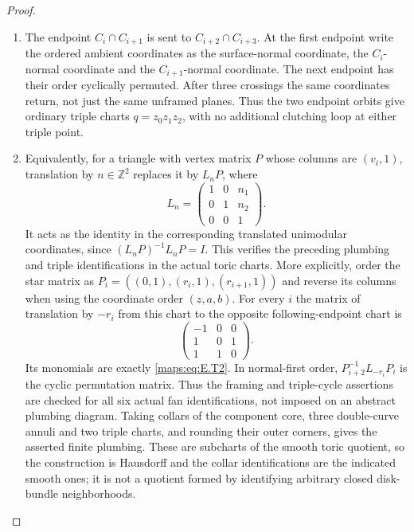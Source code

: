\begin{proof}
\begin{enumerate}[label=\arabic*.,leftmargin=*]
\item The endpoint $C_i\cap C_{i+1}$ is sent to
$C_{i+2}\cap C_{i+3}$.  At the first endpoint write the
ordered ambient coordinates as the surface-normal coordinate,
the $C_i$-normal coordinate and the $C_{i+1}$-normal coordinate.
The next endpoint has their order cyclically permuted.
After three crossings the same coordinates return, not just
the same unframed planes.  Thus the two endpoint orbits give
ordinary triple charts $q=z_0z_1z_2$, with no additional
clutching loop at either triple point.

\item Equivalently, for a triangle with vertex matrix $P$ whose
columns are $(v_i,1)$, translation by $n\in\mathbb Z^2$
replaces it by $L_nP$, where
\[
 L_n=\begin{pmatrix}1&0&n_1\\0&1&n_2\\0&0&1\end{pmatrix}.
 \tag{E.T7}\label{maps:eq:E.T7}
\]
It acts as the identity in the corresponding translated
unimodular coordinates, since
$(L_nP)^{-1}L_nP=I$.  This verifies the preceding plumbing
and triple identifications in the actual toric charts.
More explicitly, order the star matrix as
$P_i=((0,1),(r_i,1),(r_{i+1},1))$ and reverse its
columns when using the coordinate order $(z,a,b)$.
For every $i$ the matrix of translation by $-r_i$ from
this chart to the opposite following-endpoint chart is
\[
 \begin{pmatrix}-1&0&0\\1&0&1\\1&1&0\end{pmatrix}.
 \tag{E.T9}\label{maps:eq:E.T9}
\]
Its monomials are exactly \eqref{maps:eq:E.T2}.  In normal-first order,
$P_{i+2}^{-1}L_{-r_i}P_i$ is the cyclic permutation
matrix.  Thus the framing and triple-cycle assertions
are checked for all six actual fan identifications,
not imposed on an abstract plumbing diagram.
Taking collars of the component core, three double-curve
annuli and two triple charts, and rounding their outer
corners, gives the asserted finite plumbing.  These are
subcharts of the smooth toric quotient, so the construction
is Hausdorff and the collar identifications are the indicated
smooth ones; it is not a quotient formed by identifying
arbitrary closed disk-bundle neighborhoods.


\end{enumerate}
\end{proof}

